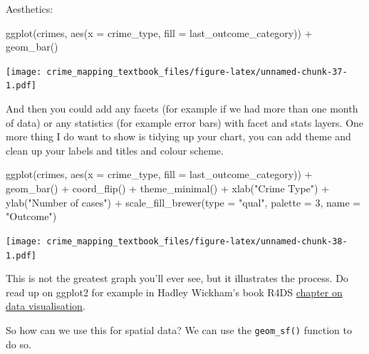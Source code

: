 \documentclass[
]{book}
\newenvironment{Shaded}{\begin{snugshade}}{\end{snugshade}}
\newcommand{\AttributeTok}[1]{\textcolor[rgb]{0.77,0.63,0.00}{#1}}
\newcommand{\DecValTok}[1]{\textcolor[rgb]{0.00,0.00,0.81}{#1}}
\newcommand{\FunctionTok}[1]{\textcolor[rgb]{0.00,0.00,0.00}{#1}}
\newcommand{\NormalTok}[1]{#1}
\newcommand{\SpecialCharTok}[1]{\textcolor[rgb]{0.00,0.00,0.00}{#1}}
\newcommand{\StringTok}[1]{\textcolor[rgb]{0.31,0.60,0.02}{#1}}
\begin{document}
Aesthetics:

\begin{Shaded}
\begin{Highlighting}[]
\FunctionTok{ggplot}\NormalTok{(crimes, }\FunctionTok{aes}\NormalTok{(}\AttributeTok{x =}\NormalTok{ crime\_type, }\AttributeTok{fill =}\NormalTok{ last\_outcome\_category)) }\SpecialCharTok{+} 
  \FunctionTok{geom\_bar}\NormalTok{()}
\end{Highlighting}
\end{Shaded}

\texttt{[image: crime\_mapping\_textbook\_files/figure-latex/unnamed-chunk-37-1.pdf]}

And then you could add any facets (for example if we had more than one month of data) or any statistics (for example error bars) with facet and stats layers. One more thing I do want to show is tidying up your chart, you can add theme and clean up your labels and titles and colour scheme.

\begin{Shaded}
\begin{Highlighting}[]
\FunctionTok{ggplot}\NormalTok{(crimes, }\FunctionTok{aes}\NormalTok{(}\AttributeTok{x =}\NormalTok{ crime\_type, }\AttributeTok{fill =}\NormalTok{ last\_outcome\_category)) }\SpecialCharTok{+} 
  \FunctionTok{geom\_bar}\NormalTok{() }\SpecialCharTok{+} 
  \FunctionTok{coord\_flip}\NormalTok{() }\SpecialCharTok{+} 
  \FunctionTok{theme\_minimal}\NormalTok{() }\SpecialCharTok{+} 
  \FunctionTok{xlab}\NormalTok{(}\StringTok{"Crime Type"}\NormalTok{) }\SpecialCharTok{+} 
  \FunctionTok{ylab}\NormalTok{(}\StringTok{"Number of cases"}\NormalTok{) }\SpecialCharTok{+} 
  \FunctionTok{scale\_fill\_brewer}\NormalTok{(}\AttributeTok{type =} \StringTok{"qual"}\NormalTok{, }\AttributeTok{palette =} \DecValTok{3}\NormalTok{, }\AttributeTok{name =} \StringTok{"Outcome"}\NormalTok{)}
\end{Highlighting}
\end{Shaded}

\texttt{[image: crime\_mapping\_textbook\_files/figure-latex/unnamed-chunk-38-1.pdf]}

This is not the greatest graph you'll ever see, but it illustrates the process. Do read up on ggplot2 for example in Hadley Wickham's book R4DS \href{https://r4ds.had.co.nz/data-visualisation.html}{chapter on data visualisation}.

So how can we use this for spatial data? We can use the \texttt{geom\_sf()} function to do so.
\end{document}
